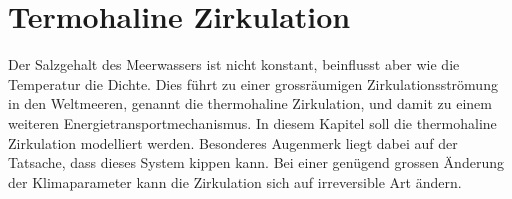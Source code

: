 %
%
%
\chapter{Termohaline Zirkulation}
Der Salzgehalt des Meerwassers ist nicht konstant, beinflusst aber
wie die Temperatur die Dichte.
Dies führt zu einer grossräumigen Zirkulationsströmung in den Weltmeeren,
genannt die thermohaline Zirkulation,
und damit zu einem weiteren Energietransportmechanismus.
In diesem Kapitel soll die thermohaline Zirkulation modelliert werden.
Besonderes Augenmerk liegt dabei auf der Tatsache, dass dieses System
kippen kann.
Bei einer genügend grossen Änderung der Klimaparameter kann die Zirkulation
sich auf irreversible Art ändern.







